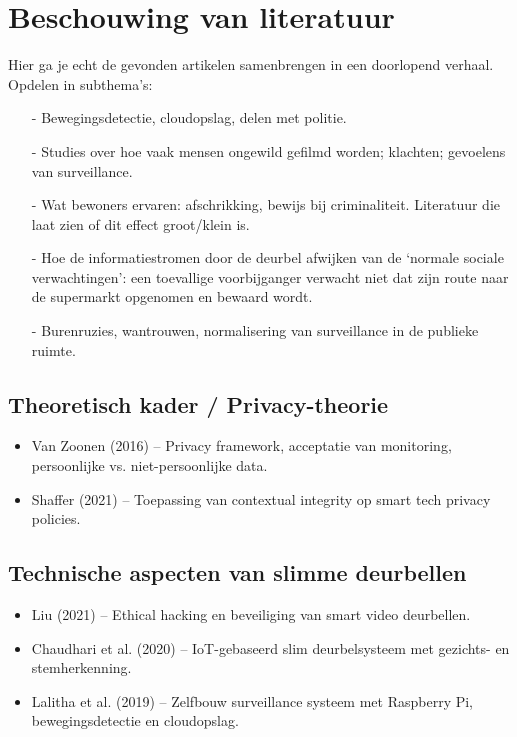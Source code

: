 \documentclass[nonacm,sigconf]{acmart}
\begin{document}
    \section{Beschouwing van literatuur}
    \begin{editorsonlyBox}
        Hier ga je echt de gevonden artikelen samenbrengen in een doorlopend verhaal.
        Opdelen in subthema’s:

        \begin{itemize}[leftmargin = *,listparindent =1cm]
            \item[-] Bewegingsdetectie, cloudopslag, delen met politie.
            \item[-] Studies over hoe vaak mensen ongewild gefilmd worden; klachten; gevoelens van surveillance.
            \item[-] Wat bewoners ervaren: afschrikking, bewijs bij criminaliteit. Literatuur die laat zien of dit effect groot/klein is.
            \item[-] Hoe de informatiestromen door de deurbel afwijken van de ‘normale sociale verwachtingen’: een toevallige voorbijganger verwacht niet dat zijn route naar de supermarkt opgenomen en bewaard wordt.
            \item[-] Burenruzies, wantrouwen, normalisering van surveillance in de publieke ruimte.
        \end{itemize}

        \vertspace

        \subsection{Theoretisch kader / Privacy-theorie}
        \begin{itemize}
            \item Van Zoonen (2016) – Privacy framework, acceptatie van monitoring, persoonlijke vs. niet-persoonlijke data.
            \item Shaffer (2021) – Toepassing van contextual integrity op smart tech privacy policies.
        \end{itemize}

        \subsection{Technische aspecten van slimme deurbellen}
        \begin{itemize}
            \item Liu (2021) – Ethical hacking en beveiliging van smart video deurbellen.
            \item Chaudhari et al. (2020) – IoT-gebaseerd slim deurbelsysteem met gezichts- en stemherkenning.
            \item Lalitha et al. (2019) – Zelfbouw surveillance systeem met Raspberry Pi, bewegingsdetectie en cloudopslag.
        \end{itemize}


\end{editorsonlyBox}
\end{document}
